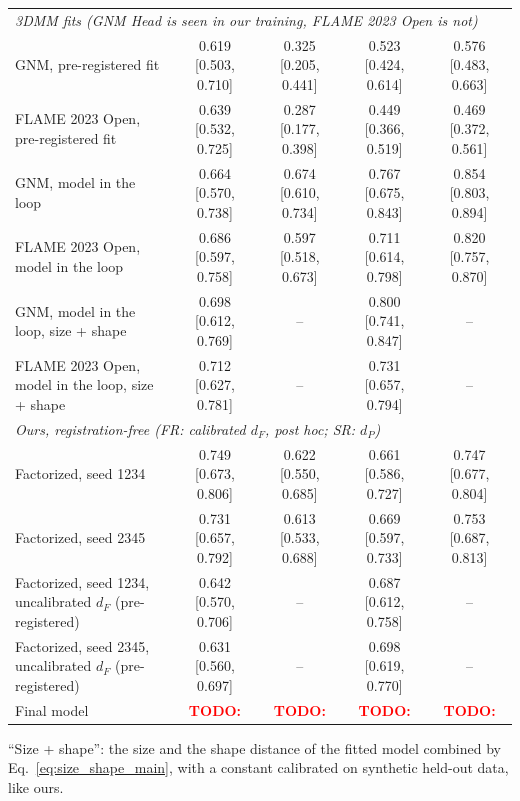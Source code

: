 \documentclass[10pt,twocolumn,letterpaper]{article}
\newcommand{\todo}[1]{\textcolor{red}{\textbf{TODO:} #1}}
\begin{document}
\begin{table}[!ht]
{\begin{tabular}{lcccc}
\midrule
\multicolumn{5}{l}{\emph{3DMM fits (GNM Head is seen in our training, FLAME 2023 Open is not)}} \\
GNM, pre-registered fit                   & 0.619 [0.503, 0.710] & 0.325 [0.205, 0.441] & 0.523 [0.424, 0.614] & 0.576 [0.483, 0.663] \\
FLAME 2023 Open, pre-registered fit       & 0.639 [0.532, 0.725] & 0.287 [0.177, 0.398] & 0.449 [0.366, 0.519] & 0.469 [0.372, 0.561] \\
GNM, model in the loop                    & 0.664 [0.570, 0.738] & 0.674 [0.610, 0.734] & 0.767 [0.675, 0.843] & 0.854 [0.803, 0.894] \\
FLAME 2023 Open, model in the loop        & 0.686 [0.597, 0.758] & 0.597 [0.518, 0.673] & 0.711 [0.614, 0.798] & 0.820 [0.757, 0.870] \\
GNM, model in the loop, size + shape      & 0.698 [0.612, 0.769] & -- & 0.800 [0.741, 0.847] & -- \\
FLAME 2023 Open, model in the loop, size + shape & 0.712 [0.627, 0.781] & -- & 0.731 [0.657, 0.794] & -- \\
\midrule
\multicolumn{5}{l}{\emph{Ours, registration-free (FR: calibrated $d_F$, post hoc; SR: $d_P$)}} \\
Factorized, seed 1234                     & 0.749 [0.673, 0.806] & 0.622 [0.550, 0.685] & 0.661 [0.586, 0.727] & 0.747 [0.677, 0.804] \\
Factorized, seed 2345                     & 0.731 [0.657, 0.792] & 0.613 [0.533, 0.688] & 0.669 [0.597, 0.733] & 0.753 [0.687, 0.813] \\
Factorized, seed 1234, uncalibrated $d_F$ (pre-registered) & 0.642 [0.570, 0.706] & -- & 0.687 [0.612, 0.758] & -- \\
Factorized, seed 2345, uncalibrated $d_F$ (pre-registered) & 0.631 [0.560, 0.697] & -- & 0.698 [0.619, 0.770] & -- \\
Final model                               & \todo{} & \todo{} & \todo{} & \todo{} \\ %
\bottomrule
\end{tabular}
}
\vspace{0.3em}

\footnotesize{``Size + shape'': the size and the shape distance of the fitted model combined by Eq.~\eqref{eq:size_shape_main}, with a constant calibrated on synthetic held-out data, like ours.}
\end{table}
\end{document}
